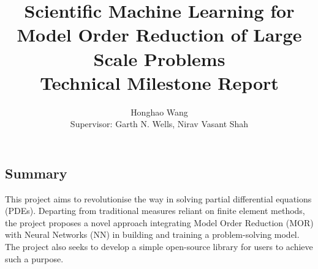 \documentclass[12pt]{article}
\title{Scientific Machine Learning for Model Order Reduction of Large Scale Problems \\ \Large Technical Milestone Report}
\author{Honghao Wang \\[0.5cm]{\Small Supervisor: Garth N. Wells, Nirav Vasant Shah}}
\begin{document}
\maketitle

\begin{center}
    \section*{\small Summary}
\end{center}

{\footnotesize This project aims to revolutionise the way in solving partial differential equations (PDEs). Departing from traditional measures reliant on finite element methods, the project proposes a novel approach integrating Model Order Reduction (MOR) with Neural Networks (NN) in building and training a problem-solving model. The project also seeks to develop a simple open-source library for users to achieve such a purpose. }








\end{document}
